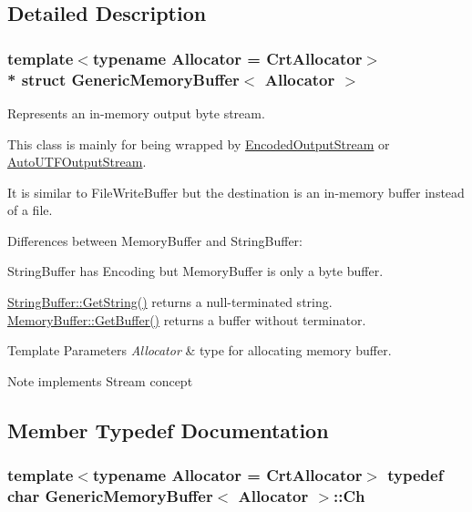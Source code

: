 \subsection{Detailed Description}
\subsubsection*{template$<$typename Allocator = Crt\+Allocator$>$\\*
struct Generic\+Memory\+Buffer$<$ Allocator $>$}

Represents an in-\/memory output byte stream. 

This class is mainly for being wrapped by \hyperlink{classEncodedOutputStream}{Encoded\+Output\+Stream} or \hyperlink{classAutoUTFOutputStream}{Auto\+U\+T\+F\+Output\+Stream}.

It is similar to File\+Write\+Buffer but the destination is an in-\/memory buffer instead of a file.

Differences between Memory\+Buffer and String\+Buffer\+:
\begin{DoxyEnumerate}
\item String\+Buffer has Encoding but Memory\+Buffer is only a byte buffer.
\item \hyperlink{classGenericStringBuffer_a42ed917a29012d932802f2709e11c572}{String\+Buffer\+::\+Get\+String()} returns a null-\/terminated string. \hyperlink{structGenericMemoryBuffer_a9afc78eef159fcbc10d0cea84ccfb26d}{Memory\+Buffer\+::\+Get\+Buffer()} returns a buffer without terminator.
\end{DoxyEnumerate}


\begin{DoxyTemplParams}{Template Parameters}
{\em Allocator} & type for allocating memory buffer. \\
\hline
\end{DoxyTemplParams}
\begin{DoxyNote}{Note}
implements Stream concept 
\end{DoxyNote}


\subsection{Member Typedef Documentation}
\subsubsection[{\texorpdfstring{Ch}{Ch}}]{\setlength{\rightskip}{0pt plus 5cm}template$<$typename Allocator  = Crt\+Allocator$>$ typedef char {\bf Generic\+Memory\+Buffer}$<$ Allocator $>$\+::{\bf Ch}}\hypertarget{structGenericMemoryBuffer_a212f137abfd8bce2ad216b2d960c027f}{}\label{structGenericMemoryBuffer_a212f137abfd8bce2ad216b2d960c027f}


